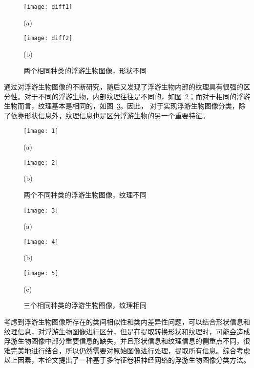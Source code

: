 \begin{figure}[H]
\centering
\begin{minipage}[]{0.42\linewidth} 
      \centering 
      \texttt{[image: diff1]}
        \centerline{(a) }\medskip
\end{minipage}
  \begin{minipage}[]{0.42\linewidth}
    \centering
    \texttt{[image: diff2]}
      \centerline{(b) }\medskip
  \end{minipage}
 \caption{两个相同种类的浮游生物图像，形状不同}
\label{fig:diff}
\end{figure}

通过对浮游生物图像的不断研究，随后又发现了浮游生物内部的纹理具有很强的区分性。对于不同的浮游生物，内部纹理往往是不同的，如图~\ref{fig:texture1}；而对于相同的浮游生物而言，纹理基本是相同的，如图~\ref{fig:texture2}。因此， 对于实现浮游生物图像分类，除了依靠形状信息外，纹理信息也是区分浮游生物的另一个重要特征。

\begin{figure}[H]
\centering
\begin{minipage}[]{0.45\linewidth} 
      \centering 
      \texttt{[image: 1]}
        \centerline{(a) }\medskip
\end{minipage}
  \begin{minipage}[]{0.45\linewidth}
    \centering
    \texttt{[image: 2]}
      \centerline{(b) }\medskip
  \end{minipage}
 \caption{两个不同种类的浮游生物图像，纹理不同}
\label{fig:texture1}
\end{figure}

\begin{figure}[H]
\centering
\begin{minipage}[]{0.3\linewidth} 
      \centering 
      \texttt{[image: 3]}
        \centerline{(a) }\medskip
\end{minipage}
  \begin{minipage}[]{0.3\linewidth}
    \centering
    \texttt{[image: 4]}
      \centerline{(b) }\medskip
  \end{minipage}
  \begin{minipage}[]{0.3\linewidth}
    \centering
    \texttt{[image: 5]}
      \centerline{(c) }\medskip
  \end{minipage}
  \caption{三个相同种类的浮游生物图像，纹理相同}
\label{fig:texture2}
\end{figure}

考虑到浮游生物图像所存在的类间相似性和类内差异性问题，可以结合形状信息和纹理信息，对浮游生物图像进行区分，但是在提取转换形状和纹理时，可能会造成浮游生物图像中部分重要信息的缺失，并且形状信息和纹理信息的侧重点不同，很难完美地进行结合，所以仍然需要对原始图像进行处理，提取所有信息。综合考虑以上因素，本论文提出了一种基于多特征卷积神经网络的浮游生物图像分类方法。

